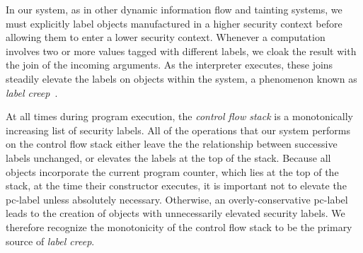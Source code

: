 \documentclass[preprint]{sigplanconf}
\newtheorem{theorem}{Theorem}
\begin{document}

In our system, as in other dynamic information flow and tainting systems, we must explicitly label objects manufactured in a higher security context before allowing them to enter a lower security context.
Whenever a computation involves two or more values tagged with different labels, we cloak the result with the join of the incoming arguments.
As the interpreter executes, these joins steadily elevate the labels on objects within the system, a phenomenon known as \textit{label creep}~\cite{1159651}.

At all times during program execution, the \textit{control flow stack} is a monotonically increasing list of security labels.
All of the operations that our system performs on the control flow stack either leave the the relationship between successive labels unchanged, or elevates the labels at the top of the stack.
Because all objects incorporate the current program counter, which lies at the top of the stack, at the time their constructor executes, it is important not to elevate the pc-label unless absolutely necessary.
Otherwise, an overly-conservative pc-label leads to the creation of objects with unnecessarily elevated security labels.
We therefore recognize the monotonicity of the control flow stack to be the primary source of \textit{label creep}.
\end{document}
